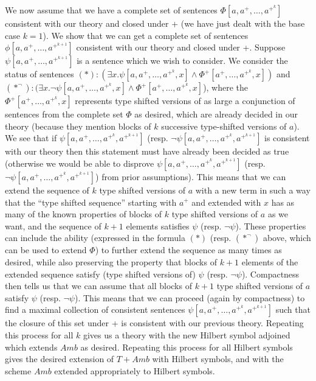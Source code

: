 \documentclass[12pt]{book}
\begin{document}
\begin{description}
We now assume that we have a
complete set of sentences $\Phi[a,a^+,\ldots,a^{+^k}]$ consistent with
our theory and closed under + (we have just dealt with the base case
$k=1$).  We show that we can get a complete set of sentences
$\phi[a,a^+,\ldots,a^{+^{k+1}}]$ consistent with our theory and closed
under +.  Suppose $\psi[a,a^+,\ldots,a^{+^{k+1}}]$ is a sentence which
we wish to consider.  We consider the status of sentences $(*):
(\exists x.\psi[a,a^+,\ldots,a^{+^{k}},x] \wedge
\Phi^+[a^+,\ldots,a^{+^{k}},x])$ and $(*^{\neg}): (\exists
x.\neg\psi[a,a^+,\ldots,a^{+^{k}},x] \wedge
\Phi^+[a^+,\ldots,a^{+^{k}},x]$), where the $\Phi^+[a^+,\ldots,a^{+^{k}},x]$ represents type shifted versions of as large a conjunction of sentences from the complete set $\Phi$ as desired, which are already decided in our
theory (because they mention blocks of $k$ successive type-shifted
versions of $a$).  We see that if
$\psi[a,a^+,\ldots,a^{+^{k}},a^{+^{k+1}}]$
(resp. $\neg\psi[a,a^+,\ldots,a^{+^{k}},a^{+^{k+1}}]$ is consistent
with our theory then this statement must have already been decided as
true (otherwise we would be able to disprove
$\psi[a,a^+,\ldots,a^{+^{k}},a^{+^{k+1}}]$
(resp. $\neg\psi[a,a^+,\ldots,a^{+^{k}},a^{+^{k+1}}]$) from prior
assumptions).  This means that we can extend the sequence of $k$ type
shifted versions of $a$ with a new term in such a way that the ``type
shifted sequence'' starting with $a^+$ and extended with $x$ has as
many of the known properties of blocks of $k$ type shifted versions of
$a$ as we want, and the sequence of $k+1$ elements satisfies $\psi$
(resp. $\neg\psi$).  These properties can include the ability
(expressed in the formula $(*)$ (resp. $(*^{\neg})$ above, which can
be used to extend $\Phi$) to further extend the sequence as many times
as desired, while also preserving the property that blocks of $k+1$
elements of the extended sequence satisfy (type shifted versions of)
$\psi$ (resp. $\neg \psi$).  Compactness then tells us that we can
assume that all blocks of $k+1$ type shifted versions of $a$ satisfy
$\psi$ (resp. $\neg\psi$).  This means that we can proceed (again by
compactness) to find a maximal collection of consistent sentences
$\psi[a,a^+,\ldots,a^{+^{k}},a^{+^{k+1}}]$ such that the closure of
this set under + is consistent with our previous theory.  Repeating
this process for all $k$ gives us a theory with the new Hilbert symbol
adjoined which extends $Amb$ as desired.  Repeating this process for
all Hilbert symbols gives the desired extension of $T+Amb$ with
Hilbert symbols, and with the scheme $Amb$ extended appropriately to
Hilbert symbols.

\end{description}
\end{document}
